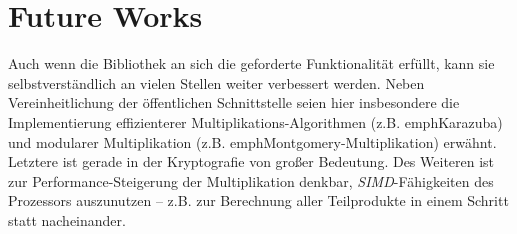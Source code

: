 \section{Future Works}
Auch wenn die Bibliothek an sich die geforderte Funktionalität erfüllt, kann sie selbstverständlich an vielen Stellen weiter verbessert werden.
Neben Vereinheitlichung der öffentlichen Schnittstelle seien hier insbesondere die Implementierung effizienterer Multiplikations-Algorithmen (z.B. emph{Karazuba}) und modularer Multiplikation (z.B. emph{Montgomery-Multiplikation}) erwähnt. Letztere ist gerade in der Kryptografie von großer Bedeutung.
Des Weiteren ist zur Performance-Steigerung der Multiplikation denkbar, \emph{SIMD}-Fähigkeiten des Prozessors auszunutzen -- z.B. zur Berechnung aller Teilprodukte in einem Schritt statt nacheinander.
